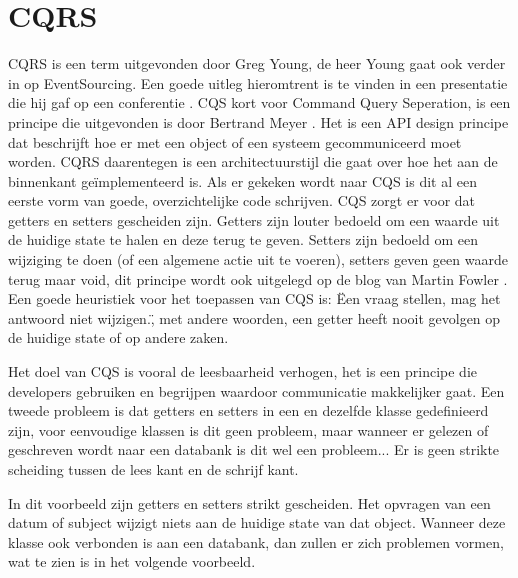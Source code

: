 
\chapter{CQRS}
\label{ch:CQRS}

\gls{CQRS} is een term uitgevonden door Greg Young, de heer Young gaat ook verder in op EventSourcing. Een goede uitleg hieromtrent is te vinden in een presentatie die hij gaf op een conferentie \autocite{Young2014CQRSandES}. \gls{CQS} kort voor Command Query Seperation, is een principe die uitgevonden is door Bertrand Meyer \autocite{Meyer1988}. Het is een API design principe dat beschrijft hoe er met een object of een systeem gecommuniceerd moet worden. CQRS daarentegen is een architectuurstijl die gaat over hoe het aan de binnenkant geïmplementeerd is. Als er gekeken wordt naar \gls{CQS} is dit al een eerste vorm van goede, overzichtelijke code schrijven. \gls{CQS} zorgt er voor dat getters en setters gescheiden zijn. Getters zijn louter bedoeld om een waarde uit de huidige state te halen en deze terug te geven. Setters zijn bedoeld om een wijziging te doen (of een algemene actie uit te voeren), setters geven geen waarde terug maar void, dit principe wordt ook uitgelegd op de blog van Martin Fowler \autocite{Fowler2005CQS}. Een goede heuristiek voor het toepassen van \gls{CQS} is: \"Een vraag stellen, mag het antwoord niet wijzigen.\", met andere woorden, een getter heeft nooit gevolgen op de huidige state of op andere zaken.

Het doel van \gls{CQS} is vooral de leesbaarheid verhogen, het is een principe die developers gebruiken en begrijpen waardoor communicatie makkelijker gaat.
Een tweede probleem is dat getters en setters in een en dezelfde klasse gedefinieerd zijn, voor eenvoudige klassen is dit geen probleem, maar wanneer er gelezen of geschreven wordt naar een databank is dit wel een probleem... Er is geen strikte scheiding tussen de lees kant en de schrijf kant.


In dit voorbeeld zijn getters en setters strikt gescheiden. Het opvragen van een datum of subject wijzigt niets aan de huidige state van dat object. Wanneer deze klasse ook verbonden is aan een databank, dan zullen er zich problemen vormen, wat te zien is in het volgende voorbeeld.


